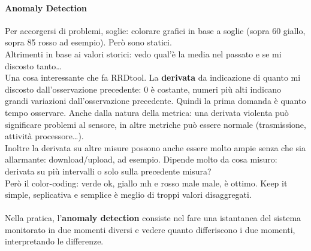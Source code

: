 \documentclass[10pt]{book}
\begin{document}
\paragraph{Anomaly Detection} Per accorgersi di problemi, soglie: colorare grafici in base a soglie (sopra 60 giallo, sopra 85 rosso ad esempio). Però sono statici.\\
Altrimenti in base ai valori storici: vedo qual'è la media nel passato e se mi discosto tanto\ldots\\
Una cosa interessante che fa RRDtool. La \textbf{derivata} da indicazione di quanto mi discosto dall'osservazione precedente: 0 è costante, numeri più alti indicano grandi variazioni dall'osservazione precedente. Quindi la prima domanda è quanto tempo osservare. Anche dalla natura della metrica: una derivata violenta può significare problemi al sensore, in altre metriche può essere normale (trasmissione, attività processore\ldots).\\
Inoltre la derivata su altre misure possono anche essere molto ampie senza che sia allarmante: download/upload, ad esempio. Dipende molto da cosa misuro: derivata su più intervalli o solo sulla precedente misura?\\
Però il color-coding: verde ok, giallo mh e rosso male male, è ottimo. Keep it simple, seplicativa e semplice è meglio di troppi valori disaggregati.\\\\
Nella pratica, l'\textbf{anomaly detection} consiste nel fare una istantanea del sistema monitorato in due momenti diversi e vedere quanto differiscono i due momenti, interpretando le differenze.
\end{document}
